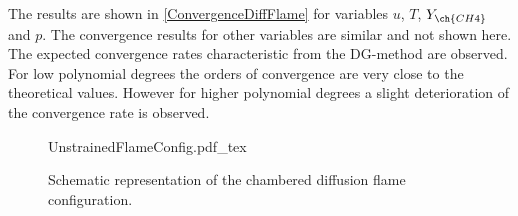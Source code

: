 The results are shown in \cref{ConvergenceDiffFlame} for variables $u$, $T$, $Y_{\ch{CH4}}$ and $p$. The convergence results for other variables are similar and not shown here. The expected convergence rates characteristic from the DG-method are observed. For low polynomial degrees the orders of convergence are very close to the theoretical values. However for higher polynomial degrees  a slight deterioration of the convergence rate is observed.
\begin{figure}[h]
	\begin{center}
		\def\svgwidth{0.4\textwidth}
		{UnstrainedFlameConfig.pdf_tex}
		\caption{Schematic representation of the chambered diffusion flame configuration. }
		\label{fig:chamberedDifFlame}
	\end{center}
\end{figure}